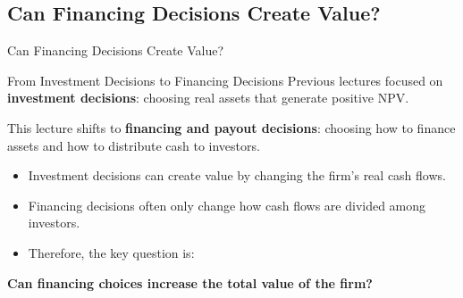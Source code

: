 
\subsection{Can Financing Decisions Create Value?}
\begin{frame}{Can Financing Decisions Create Value?}
\begin{block}{From Investment Decisions to Financing Decisions}
Previous lectures focused on \textbf{investment decisions}: choosing real assets that generate positive NPV.

This lecture shifts to \textbf{financing and payout decisions}: choosing how to finance assets and how to distribute cash to investors.
\end{block}

\begin{itemize}
    \item Investment decisions can create value by changing the firm's real cash flows.
    \item Financing decisions often only change how cash flows are divided among investors.
    \item Therefore, the key question is:
\end{itemize}

\begin{center}
\large
\textbf{Can financing choices increase the total value of the firm?}
\end{center}



\end{frame}

